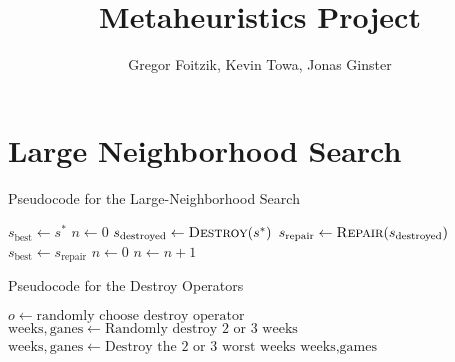 \documentclass[12pt]{article}
\title{Metaheuristics Project}
\author{Gregor Foitzik, Kevin Towa, Jonas Ginster}
\begin{document}
\maketitle
\section{Large Neighborhood Search}
\begin{algorithm}
    \caption{Pseudocode for the Large-Neighborhood Search}
    \begin{algorithmic}[1]
            \State $s_{\text{best}}\leftarrow s^*$
            \State $n\leftarrow 0$
             
                \State $s_{\text{destroyed}}\leftarrow \Call{Destroy}{s^*}$ 
                \State $s_{\text{repair}}\leftarrow \Call{Repair}{s_{\text{destroyed}}}$
                    \State $s_{\text{best}} \leftarrow s_{\text{repair}}$
                    \State $n\leftarrow 0$
                \Else
                    \State $n\leftarrow n + 1$ 
                \EndIf
            \EndWhile
        \EndFunction
    \end{algorithmic}
\end{algorithm}


\begin{algorithm}
    \caption{Pseudocode for the Destroy Operators}
    \begin{algorithmic}[1] 
            \State $o\leftarrow \text{randomly choose destroy operator}$
                \State $\text{weeks}, \text{ganes}\leftarrow \text{Randomly destroy 2 or 3 weeks}$ 
                \State $\text{weeks}, \text{ganes}\leftarrow \text{Destroy the 2 or 3 worst weeks}$
            \EndIf
            \Return $\text{weeks}, \text{games}$
        \EndFunction
    \end{algorithmic}
\end{algorithm}
\end{document}
